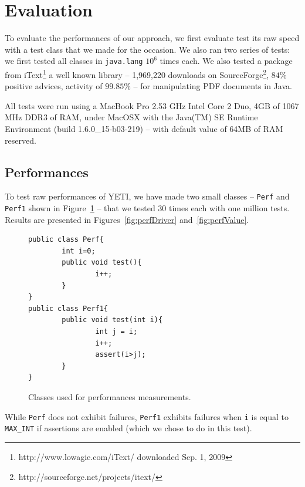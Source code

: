 \section{Evaluation}\label{sec:evaluation}

To evaluate the performances of our approach, we first evaluate test its  raw speed with a test class that we made for the occasion. We also ran two series of tests: we first tested all classes in \texttt{java.lang} $10^{6}$ times each. We also tested a package from iText\footnote{http://www.lowagie.com/iText/ downloaded Sep. 1, 2009} a well known library -- 1,969,220 downloads on SourceForge\footnote{http://sourceforge.net/projects/itext/}, $84\%$ positive advices, activity of $99.85\%$ -- for manipulating PDF documents in Java. 

All tests were run using a MacBook Pro 2.53 GHz Intel Core 2 Duo, 4GB of 1067 MHz DDR3 of RAM, under MacOSX with the Java(TM) SE Runtime Environment (build 1.6.0\_15-b03-219) -- with default value of 64MB of RAM reserved. 

\subsection{Performances}

To test raw performances of YETI, we have made two small classes -- \texttt{Perf} and \texttt{Perf1} shown in Figure~\ref{fig:perf} -- that we tested 30 times each with one million tests. Results are presented in Figures~\ref{fig:perfDriver} and~\ref{fig:perfValue}.

\begin{figure}[h!]
{\small
\begin{verbatim}
public class Perf{
        int i=0;
        public void test(){
                i++;
        }
}
public class Perf1{
        public void test(int i){
                int j = i;
                i++;
                assert(i>j);
        }
}
\end{verbatim}
}
\caption{Classes used for performances measurements.}\label{fig:perf}
\end{figure}

While \texttt{Perf} does not exhibit failures, \texttt{Perf1} exhibits failures when \texttt{i} is equal to \texttt{MAX\_INT} if assertions are enabled (which we chose to do in this test).

